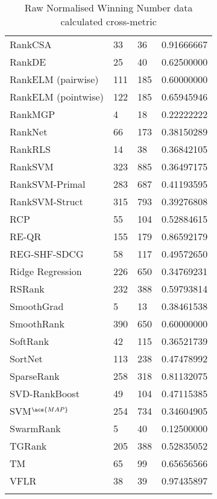 \begin{longtable}{l|l|l|l}
RankCSA & 33 & 36 & 0.91666667 \\ 
RankDE & 25 & 40 & 0.62500000 \\ 
RankELM (pairwise) & 111 & 185 & 0.60000000 \\ 
RankELM (pointwise) & 122 & 185 & 0.65945946 \\ 
RankMGP & 4 & 18 & 0.22222222 \\ 
RankNet & 66 & 173 & 0.38150289 \\ 
Rank\acs{RLS} & 14 & 38 & 0.36842105 \\ 
Rank\acs{SVM} & 323 & 885 & 0.36497175 \\ 
Rank\acs{SVM}-Primal & 283 & 687 & 0.41193595 \\ 
Rank\acs{SVM}-Struct & 315 & 793 & 0.39276808 \\ 
RCP & 55 & 104 & 0.52884615 \\ 
RE-QR & 155 & 179 & 0.86592179 \\ 
REG-SHF-SDCG & 58 & 117 & 0.49572650 \\ 
Ridge Regression & 226 & 650 & 0.34769231 \\ 
RSRank & 232 & 388 & 0.59793814 \\ 
SmoothGrad & 5 & 13 & 0.38461538 \\ 
SmoothRank & 390 & 650 & 0.60000000 \\ 
SoftRank & 42 & 115 & 0.36521739 \\ 
SortNet & 113 & 238 & 0.47478992 \\ 
SparseRank & 258 & 318 & 0.81132075 \\ 
\acs{SVD}-RankBoost & 49 & 104 & 0.47115385 \\ 
\acs{SVM}$^{\acs{MAP}}$ & 254 & 734 & 0.34604905 \\ 
SwarmRank & 5 & 40 & 0.12500000 \\ 
TGRank & 205 & 388 & 0.52835052 \\ 
TM & 65 & 99 & 0.65656566 \\ 
VFLR & 38 & 39 & 0.97435897 \\
\caption{Raw Normalised Winning Number data calculated cross-metric}
\label{tab:raw_data_norm_winnum_all}
\end{longtable}

